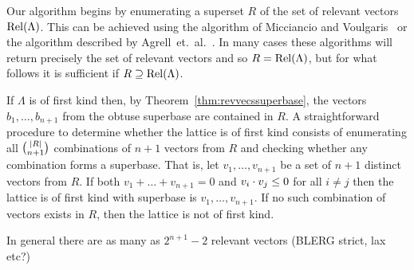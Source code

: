 \documentclass[a4paper,10pt]{article}
\begin{document}
Our algorithm begins by enumerating a superset $R$ of the set of relevant vectors $\operatorname{Rel}(\Lambda)$.  This can be achieved using the algorithm of Micciancio and Voulgaris~\cite{Micciancio09adeterministic} or the algorithm described by Agrell~et.~al.~\cite[Sec.~VI.C]{Agrell2002}.  In many cases these algorithms will return precisely the set of relevant vectors and so $R = \operatorname{Rel}(\Lambda)$, but for what follows it is sufficient if $R \supseteq \operatorname{Rel}(\Lambda)$.

If $\Lambda$ is of first kind then, by Theorem~\ref{thm:revvecssuperbase}, the vectors $b_1,\dots,b_{n+1}$ from the obtuse superbase are contained in $R$.  A straightforward procedure to determine whether the lattice is of first kind consists of enumerating all $\binom{{\left| R \right|}}{n+1}$ combinations of $n+1$ vectors from $R$ and checking whether any combination forms a superbase.  That is, let $v_1,\dots,v_{n+1}$ be a set of $n+1$ distinct vectors from $R$.  If both $v_1+\dots + v_{n+1} = 0$ and $v_{i} \cdot v_{j} \leq 0$ for all $i \neq j$ then the lattice is of first kind with superbase is $v_1,\dots,v_{n+1}$.  If no such combination of vectors exists in $R$, then the lattice is not of first kind.

In general there are as many as $2^{n+1}-2$ relevant vectors (BLERG strict, lax etc?)

\begin{figure}
\end{figure}






\end{document}
